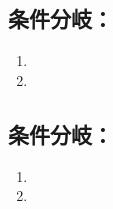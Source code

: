 \subsection{条件分岐：\PMIncutBoringExists}

\begin{enumerate}[label=\sarrow]
\item \IncutBoringMilling
\item \TopEndFaceInChamferMilling
\end{enumerate}


\subsection{条件分岐：\PMCurvedOutcutExists}

\begin{enumerate}[label=\sarrow]
\item \CurvedOutcutMilling
\item \EndFaceOutChamferMilling
\end{enumerate}
